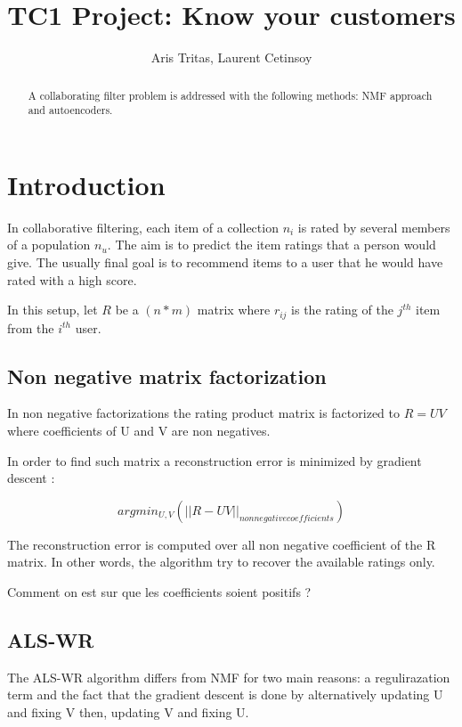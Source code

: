 \documentclass[10pt,twocolumn]{article}
\title{TC1 Project: Know your customers}
\author{Aris Tritas, Laurent Cetinsoy}
\begin{document}
\maketitle

\begin{abstract}

A collaborating filter problem is addressed with the following methods: NMF approach and autoencoders.

\end{abstract}

\section{Introduction}

In collaborative filtering, each item of a collection $n_i$ is rated by several members of a population $n_u$. The aim is to predict the item ratings that a person would give. The usually final goal is to recommend items to a user that he would have rated with a high score. 

In this setup, let $R$ be a $(n * m)$ matrix where $r_{ij}$ is the rating of the $j^{th}$  item from the $i^{th}$ user.

\subsection{Non negative matrix factorization}

In non negative factorizations the rating product matrix is factorized to $R = UV$ where coefficients of U and V are non negatives. 

In order to find such matrix a reconstruction error is minimized by gradient descent : 

$$ argmin_{U,V} ( ||R - UV||_{non negative coefficients} ) $$ 

The reconstruction error is computed over all non negative coefficient of the R matrix. In other words, the algorithm try to recover the available ratings only. 

Comment on est sur que les coefficients soient positifs ?

\subsection{ALS-WR}

The ALS-WR algorithm \cite{zhou2008large} differs from NMF for two main reasons: a regulirazation term and the fact that the gradient descent is done by alternatively updating U and fixing V then, updating V and fixing U. 
\end{document}
